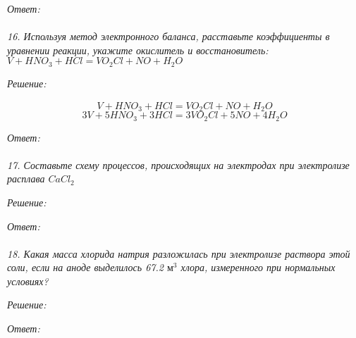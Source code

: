 \emph{Ответ: } \\\\


\emph{16. Используя метод электронного баланса, расставьте коэффициенты 
в уравнении реакции, укажите окислитель и восстановитель:
\( V + HNO_3 + HCl = VO_2 Cl + NO + H_2 O \) }

\emph{Решение:}

\[ 
	\stackrel{}{V} + \stackrel{}{H}\stackrel{}{N}\stackrel{}{O}_3 + 
	\stackrel{}{H}\stackrel{}{Cl} = \stackrel{}{V}\stackrel{}{O}_2
	\stackrel{}{Cl} + 
	\stackrel{}{N}\stackrel{}{O} + \stackrel{}{H}_2\stackrel{}{O} 
\]
\[ 3V + 5HNO_3 + 3HCl = 3VO_2 Cl + 5NO + 4H_2 O \]

\emph{Ответ: } \\\\


\emph{17. Составьте схему процессов, происходящих на электродах при 
электролизе расплава \( CaCl_2 \)}

\emph{Решение:}

\emph{Ответ: } \\\\


\emph{18. Какая масса хлорида натрия разложилась при электролизе раствора 
этой соли, если на аноде выделилось 67.2 \( \text{м}^3 \) хлора, 
измеренного при нормальных условиях?}

\emph{Решение:}

\emph{Ответ: } \\\\


